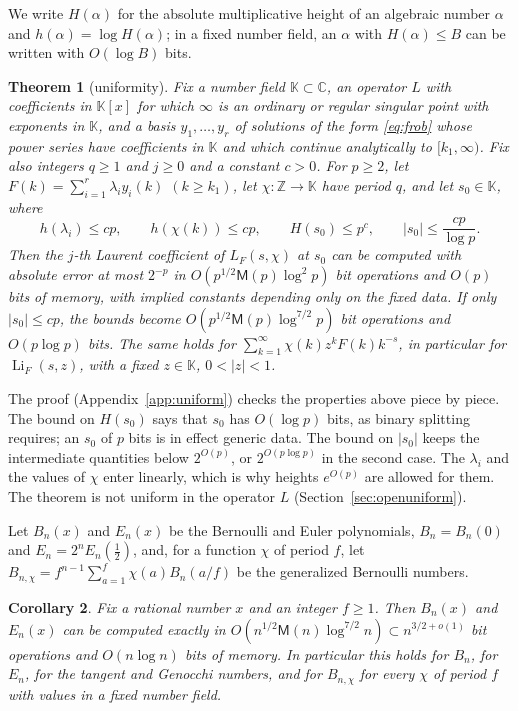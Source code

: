 \documentclass[11pt,reqno]{amsart}
\newtheorem{theorem}{Theorem}[section]
\newtheorem{corollary}[theorem]{Corollary}
\theoremstyle{definition}
\theoremstyle{remark}
\newcommand{\Li}{\operatorname{Li}}
\newcommand{\ZZ}{\mathbb{Z}}
\newcommand{\CC}{\mathbb{C}}
\newcommand{\Mul}{\mathsf{M}}
\begin{document}
We write $H(\alpha)$ for the absolute multiplicative height of an algebraic number $\alpha$ and
$h(\alpha) = \log H(\alpha)$; in a fixed number field, an $\alpha$ with $H(\alpha) \le B$ can be written with
$O(\log B)$ bits.

\begin{theorem}[uniformity]\label{thm:uniform}
Fix a number field $\mathbb K \subset \CC$, an operator $L$ with coefficients in $\mathbb K[x]$ for which $\infty$ is
an ordinary or regular singular point with exponents in $\mathbb K$, and a basis $y_1, \dots, y_r$ of solutions of
the form \eqref{eq:frob} whose power series have coefficients in $\mathbb K$ and which continue analytically to
$[k_1, \infty)$. Fix also integers $q \ge 1$ and $j \ge 0$ and a constant $c > 0$. For $p \ge 2$, let
$F(k) = \sum_{i=1}^r\lambda_iy_i(k)$ $(k \ge k_1)$, let $\chi\colon\ZZ \to \mathbb K$ have period $q$, and let
$s_0 \in \mathbb K$, where
\[
  h(\lambda_i) \le cp, \qquad h(\chi(k)) \le cp, \qquad H(s_0) \le p^c, \qquad |s_0| \le \frac{cp}{\log p}.
\]
Then the $j$-th Laurent coefficient of $L_F(s,\chi)$ at $s_0$ can be computed with absolute error at most $2^{-p}$
in $O(p^{1/2}\Mul(p)\log^2p)$ bit operations and $O(p)$ bits of memory, with implied constants depending only on the
fixed data. If only $|s_0| \le cp$, the bounds become $O(p^{1/2}\Mul(p)\log^{7/2}p)$ bit operations and $O(p\log p)$
bits. The same holds for $\sum_{k=1}^{\infty}\chi(k)z^kF(k)k^{-s}$, in particular for $\Li_F(s,z)$, with a fixed
$z \in \mathbb K$, $0 < |z| < 1$.
\end{theorem}

The proof (Appendix~\ref{app:uniform}) checks the properties above piece by piece. The bound on $H(s_0)$ says that
$s_0$ has $O(\log p)$ bits, as binary splitting requires; an $s_0$ of $p$ bits is in effect generic data. The bound on
$|s_0|$ keeps the intermediate quantities below $2^{O(p)}$, or $2^{O(p\log p)}$ in the second case. The $\lambda_i$
and the values of $\chi$ enter linearly, which is why heights $e^{O(p)}$ are allowed for them. The theorem is not
uniform in the operator $L$ (Section~\ref{sec:openuniform}).

Let $B_n(x)$ and $E_n(x)$ be the Bernoulli and Euler polynomials, $B_n = B_n(0)$ and $E_n = 2^nE_n(\frac12)$, and, for a
function $\chi$ of period $f$, let $B_{n,\chi} = f^{n-1}\sum_{a=1}^f\chi(a)B_n(a/f)$ be the generalized Bernoulli
numbers.

\begin{corollary}\label{cor:bernoulli}
Fix a rational number $x$ and an integer $f \ge 1$. Then $B_n(x)$ and $E_n(x)$ can be computed exactly in
$O(n^{1/2}\Mul(n)\log^{7/2}n) \subset n^{3/2+o(1)}$ bit operations and $O(n\log n)$ bits of memory. In particular this
holds for $B_n$, for $E_n$, for the tangent and Genocchi numbers, and for $B_{n,\chi}$ for every $\chi$ of period $f$
with values in a fixed number field.
\end{corollary}
\end{document}
